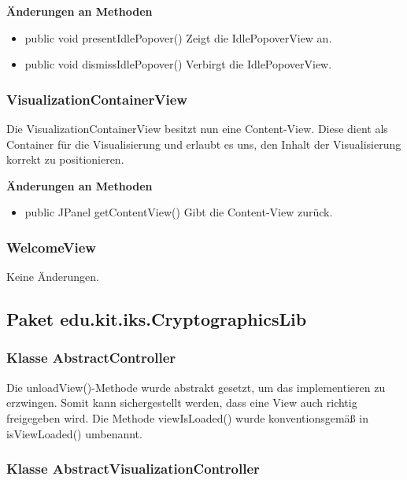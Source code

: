 \documentclass{article}
\begin{document}
      \textbf{Änderungen an Methoden}
      \begin{itemize}
        \item public void presentIdlePopover()\newline
              Zeigt die IdlePopoverView an.
        \item public void dismissIdlePopover()\newline
              Verbirgt die IdlePopoverView.
      \end{itemize}

    \subsubsection{VisualizationContainerView}
      Die VisualizationContainerView besitzt nun eine Content-View. Diese dient als Container für die Visualisierung
      und erlaubt es uns, den Inhalt der Visualisierung korrekt zu positionieren.\newline

      \textbf{Änderungen an Methoden}
      \begin{itemize}
        \item public JPanel getContentView()\newline
              Gibt die Content-View zurück.
      \end{itemize}

    \subsubsection{WelcomeView}
      Keine Änderungen.

  \subsection{Paket edu.kit.iks.CryptographicsLib}
    
  	\subsubsection{Klasse AbstractController}
  	
  	Die unloadView()-Methode wurde abstrakt gesetzt, um das implementieren zu erzwingen.
  	Somit kann sichergestellt werden, dass eine View auch richtig freigegeben wird. Die Methode
  	viewIsLoaded() wurde konventionsgemäß in isViewLoaded() umbenannt.

	\subsubsection{Klasse AbstractVisualizationController}
\end{document}
